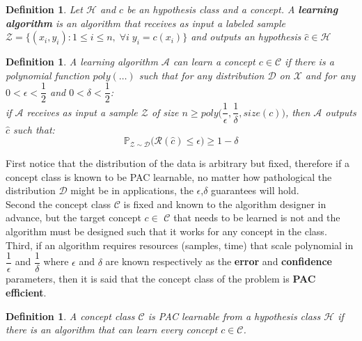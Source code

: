 \documentclass[twoside]{article}
\newtheorem{definition}[theorem]{Definition}
\begin{document}
\begin{definition}
Let $\mathbf{\mathcal{H}}$ and $c$ be an hypothesis class and a concept. A \textbf{learning algorithm} is an algorithm that receives as input a labeled sample $\mathbf{\mathcal{Z}} = \{(x_{i}
, y_{i}) : 1 \leq i \leq n, \;  \forall i \; y_{i} = c(x_{i}) \} $ and outputs an hypothesis $\hat{c} \in \mathbf{\mathcal{H}}$
\end{definition}

\begin{definition}
A learning algorithm $\mathbf{\mathcal{A}}$ can learn a concept $c \in \mathbf{\mathcal{C}}$ if there is a polynomial function $poly(\ldots)$ such that for any distribution $\mathbf{\mathcal{D}}$ on $\mathbf{\mathcal{X}}$ and for any $0 < \epsilon <\dfrac{1}{2}$ and $0 < \delta <\dfrac{1}{2}$: \\
if $\mathbf{\mathcal{A}}$ receives as input a sample $\mathbf{\mathcal{Z}}$ of size $n \geq poly\Big(\dfrac{1}{\epsilon},\dfrac{1}{\delta},size(c)\Big)$, then $\mathbf{\mathcal{A}}$ outputs $\hat{c}$ such that:
$$\mathbf{\mathbb{P}}_{\mathcal{Z} \sim \mathcal{D}}\Big(\mathcal{R}(\hat{c}) \leq \epsilon \Big) \geq 1- \delta$$
\end{definition}

First notice that the distribution of the data is arbitrary but fixed, therefore if a concept class is
known to be PAC learnable, no matter how pathological the distribution $\mathbf{\mathcal{D}}$ might
be in applications, the $\epsilon$,$ \delta$ guarantees will hold. \\
Second the concept class $\mathbf{\mathcal{C}}$ is fixed
and known to the algorithm designer in advance, but the target concept $c \in $ $\mathbf{\mathcal{C}}$ that
needs to be learned is not and the algorithm must be designed such that it works for
any concept in the class.\\
Third, if an algorithm requires resources (samples, time)
that scale polynomial in $\dfrac{1}{\epsilon}$ 
and $\dfrac{1}{\delta}$ where $\epsilon$ and $\delta$ are known respectively as the \textbf{error}
and \textbf{confidence} parameters, then it is said that the concept class of the problem is
\textbf{PAC efficient}.

\begin{definition}
A concept class $\mathbf{\mathcal{C}}$ is PAC learnable from a hypothesis class $\mathbf{\mathcal{H}}$ if there is an algorithm that can learn every concept $ c \in \mathbf{\mathcal{C}}$.
\end{definition}
\end{document}
